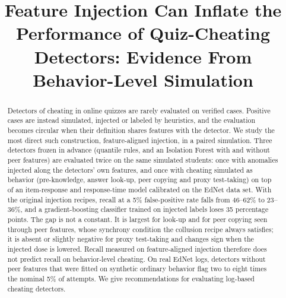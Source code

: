 \documentclass[conference,a4paper]{IEEEtran}
\begin{document}

\title{Feature Injection Can Inflate the Performance of Quiz-Cheating Detectors: Evidence From Behavior-Level Simulation}

\ifdefined\AuthorBlockFile
  
\else
\author{
\and
{}
}
\fi

\maketitle

\begin{abstract}
Detectors of cheating in online quizzes are rarely evaluated on verified cases. Positive cases are instead simulated, injected or labeled by heuristics, and the evaluation becomes circular when their definition shares features with the detector. We study the most direct such construction, feature-aligned injection, in a paired simulation. Three detectors frozen in advance (quantile rules, and an Isolation Forest with and without peer features) are evaluated twice on the same simulated students: once with anomalies injected along the detectors' own features, and once with cheating simulated as behavior (pre-knowledge, answer look-up, peer copying and proxy test-taking) on top of an item-response and response-time model calibrated on the EdNet data set. With the original injection recipes, recall at a 5\% false-positive rate falls from 46--62\% to 23--36\%, and a gradient-boosting classifier trained on injected labels loses 35 percentage points. The gap is not a constant. It is largest for look-up and for peer copying seen through peer features, whose synchrony condition the collusion recipe always satisfies; it is absent or slightly negative for proxy test-taking and changes sign when the injected dose is lowered. Recall measured on feature-aligned injection therefore does not predict recall on behavior-level cheating. On real EdNet logs, detectors without peer features that were fitted on synthetic ordinary behavior flag two to eight times the nominal 5\% of attempts. We give recommendations for evaluating log-based cheating detectors.
\end{abstract}
\end{document}
